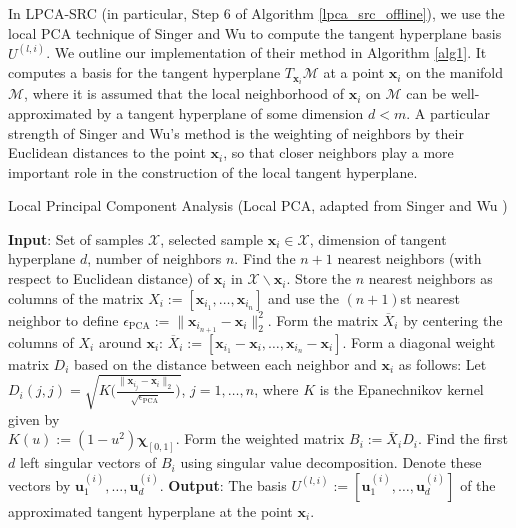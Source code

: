\documentclass[review]{elsarticle}
\begin{document}
In LPCA-SRC (in particular, Step 6 of Algorithm \ref{lpca_src_offline}), we use the local PCA technique of Singer and Wu \cite{sin:vdm} to compute the tangent hyperplane basis $U^{(l,i)}$. We outline our implementation of their method in Algorithm \ref{alg1}. It computes a basis for the tangent hyperplane $T_{\bm{x}_i}\mathscr{M}$ at a point $\bm{x}_i$ on the manifold $\mathscr{M}$, where it is assumed that the local neighborhood of $\bm{x}_i$ on $\mathscr{M}$ can be well-approximated by a tangent hyperplane of some dimension $d<m$. A particular strength of Singer and Wu's method is the weighting of neighbors by their Euclidean distances to the point $\bm{x}_i$, so that closer neighbors play a more important role in the construction of the local tangent hyperplane. 



\begin{algorithm}
\caption{Local Principal Component Analysis (Local PCA, adapted from Singer and Wu \cite{sin:vdm})}
\label{alg1}
\begin{algorithmic}[1]
\STATE \textbf{Input}: Set of samples $\mathcal{X}$, selected sample $\bm{x}_i \in \mathcal{X}$, dimension of tangent hyperplane $d$, number of neighbors $n$.
\STATE Find the $n+1$ nearest neighbors (with respect to Euclidean distance) of $\bm{x}_i$ in $\mathcal{X}\backslash \bm{x}_i$. Store the $n$ nearest neighbors as columns of the matrix $X_i := [\bm{x}_{i_1},\ldots,\bm{x}_{i_n}]$ and use the $(n+1)$st nearest neighbor to define 
$\epsilon_\mathrm{PCA} := \|\bm{x}_{i_{n+1}} - \bm{x}_i\|_2^2$.
\STATE Form the matrix $\overline{X}_i$ by centering the columns of $X_i$ around $\bm{x}_i$: $\overline{X}_i := [\bm{x}_{i_1}-\bm{x}_i,\ldots, \bm{x}_{i_n}-\bm{x}_i]$.
\STATE Form a diagonal weight matrix $D_i$ based on the distance between each neighbor and $\bm{x}_i$ as follows: Let \\
$D_i(j,j) = \sqrt{K\Big(\frac{\|\bm{x}_{i_j}-\bm{x}_i\|_2}{\sqrt{\epsilon_\mathrm{PCA}}}\Big)}$, $j=1,\ldots,n$, where $K$ is the Epanechnikov kernel given by \\
$K(u) := (1-u^2)\bm{\chi}_{[0,1]}$.
\STATE Form the weighted matrix $B_i :=\overline{X}_iD_i$.
\STATE Find the first $d$ left singular vectors of $B_i$ using singular value decomposition. Denote these vectors by $\bm{u}_1^{(i)},\ldots,\bm{u}_d^{(i)}$.
\STATE \textbf{Output}: The basis $U^{(l,i)} :=[\bm{u}_1^{(i)},\ldots,\bm{u}_d^{(i)}]$ of the approximated tangent hyperplane at the point $\bm{x}_i$.
\end{algorithmic}
\end{algorithm}
\end{document}
